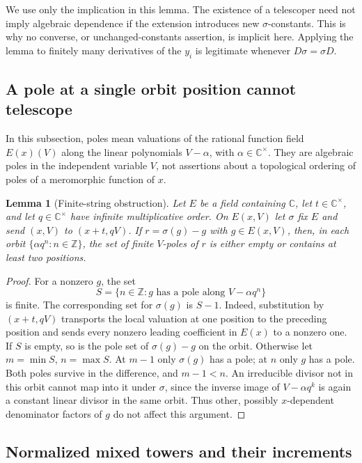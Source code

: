 \documentclass[11pt]{article}
\numberwithin{equation}{section}
\newtheorem{lemma}[lemma]{Lemma}
\theoremstyle{definition}
\theoremstyle{remark}
\newcommand{\C}{\mathbb C}
\newcommand{\Z}{\mathbb Z}
\begin{document}
We use only the implication in this lemma. The existence of a telescoper
need not imply algebraic dependence if the extension introduces new
$\sigma$-constants. This is why no converse, or unchanged-constants assertion,
is implicit here. Applying the lemma to finitely many derivatives of the
$y_i$ is legitimate whenever $D\sigma=\sigma D$.

\subsection{A pole at a single orbit position cannot telescope}

In this subsection, poles mean valuations of the rational function field
$E(x)(V)$ along the linear polynomials $V-\alpha$, with $\alpha\in\C^\times$.
They are algebraic poles in the independent variable $V$, not assertions
about a topological ordering of poles of a meromorphic function of $x$.

\begin{lemma}[Finite-string obstruction]\label{lem:orbit-poles}
Let $E$ be a field containing $\C$, let $t\in\C^\times$, and let
$q\in\C^\times$ have infinite multiplicative order. On $E(x,V)$ let
$\sigma$ fix $E$ and send $(x,V)$ to $(x+t,qV)$.
If $r=\sigma(g)-g$ with $g\in E(x,V)$, then, in each orbit
$\{\alpha q^n:n\in\Z\}$, the set of finite $V$-poles of $r$ is either
empty or contains at least two positions.
\end{lemma}
\begin{proof}
For a nonzero $g$, the set
\[
 S=\{n\in\Z:g\text{ has a pole along }V-\alpha q^n\}
\]
is finite. The corresponding set for $\sigma(g)$ is $S-1$.
Indeed, substitution by $(x+t,qV)$ transports the local valuation at one
position to the preceding position and sends every nonzero leading
coefficient in $E(x)$ to a nonzero one.
If $S$ is empty, so is the pole set of $\sigma(g)-g$ on the orbit.
Otherwise let $m=\min S$, $n=\max S$. At $m-1$ only $\sigma(g)$ has a pole;
at $n$ only $g$ has a pole. Both poles survive in the difference, and
$m-1<n$.
An irreducible divisor not in this orbit cannot map into it under $\sigma$,
since the inverse image of $V-\alpha q^k$ is again a constant linear divisor
in the same orbit. Thus other, possibly $x$-dependent denominator factors
of $g$ do not affect this argument.
\end{proof}

\subsection{Normalized mixed towers and their increments}
\end{document}
